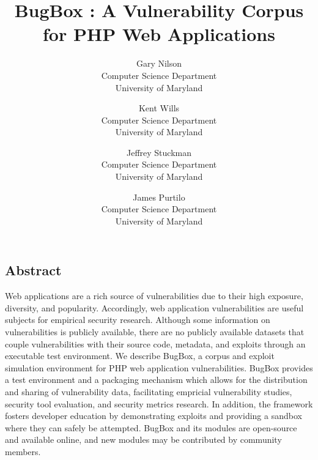 \documentclass[letterpaper,twocolumn,10pt]{article}
\begin{document}
\date{}


\title{\Large \bf BugBox : A Vulnerability Corpus for PHP Web Applications}


\author{
{\rm Gary Nilson}\\
Computer Science Department\\
University of Maryland
\and
{\rm Kent Wills}\\
Computer Science Department\\
University of Maryland
\and
{\rm Jeffrey Stuckman}\\
Computer Science Department\\
University of Maryland
\and
{\rm James Purtilo}\\
Computer Science Department\\
University of Maryland
} %

\maketitle



 
 

\subsection*{Abstract}

Web applications are a rich source of vulnerabilities due to their high exposure, diversity, and popularity. Accordingly, web application vulnerabilities are useful subjects for empirical security research. Although some information on vulnerabilities is publicly available, there are no publicly available datasets that couple vulnerabilities with their source code, metadata, and exploits through an executable test environment. We describe BugBox, a corpus and exploit simulation environment for PHP web application vulnerabilities. BugBox provides a test environment and a packaging mechanism which allows for the distribution and sharing of vulnerability data, facilitating empricial vulnerability studies, security tool evaluation, and security metrics research. In addition, the framework fosters developer education by demonstrating exploits and providing a sandbox where they can safely be attempted. BugBox and its modules are open-source and available online, and new modules may be contributed by community members.
\end{document}
